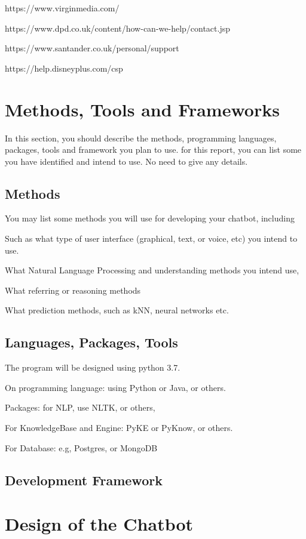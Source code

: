 \documentclass[11pt]{cmpreport}
\begin{document}
https://www.virginmedia.com/

https://www.dpd.co.uk/content/how-can-we-help/contact.jsp

https://www.santander.co.uk/personal/support

https://help.disneyplus.com/csp

\section{Methods, Tools and Frameworks}
In this section, you should describe the methods, programming languages, packages, tools and framework you plan to use.
for this report, you can list some you have identified and intend to use.
No need to give any details.  

\subsection{Methods}

You may list some methods you will use for developing your chatbot, including 
   
Such as what type of user interface (graphical, text, or voice, etc) you intend to use.

What Natural Language Processing and understanding methods you intend use, 

What referring or reasoning methods

What prediction methods, such as kNN, neural networks etc. 
             
\subsection{Languages, Packages, Tools}

The program will be designed using python 3.7.

On programming language: using Python or Java, or others. 

Packages: for NLP, use NLTK\citep{NLTK}, or others, 

For KnowledgeBase and Engine: PyKE or PyKnow, or others. 

For Database: e.g, Postgres, or MongoDB     
 
\subsection{Development Framework}


\section{Design of the Chatbot}
\end{document}
